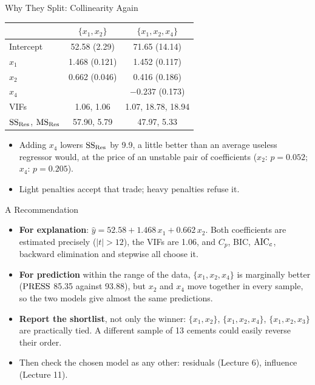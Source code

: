 \begin{frame}{Why They Split: Collinearity Again}
    \begin{center}
        \small
        \begin{tabular}{lcc}
            \toprule
            & $\{x_1,x_2\}$ & $\{x_1,x_2,x_4\}$ \\
            \midrule
            Intercept & 52.58 (2.29) & 71.65 (14.14) \\
            $x_1$ & 1.468 (0.121) & 1.452 (0.117) \\
            $x_2$ & 0.662 (0.046) & 0.416 (0.186) \\
            $x_4$ & & $-0.237$ (0.173) \\
            \midrule
            VIFs & 1.06, 1.06 & 1.07, 18.78, 18.94 \\
            $\mathrm{SS}_{\mathrm{Res}}$, $\mathrm{MS}_{\mathrm{Res}}$ & 57.90, 5.79 & 47.97, 5.33 \\
            \bottomrule
        \end{tabular}
    \end{center}
    \begin{itemize}
        \item Adding $x_4$ lowers $\mathrm{SS}_{\mathrm{Res}}$ by 9.9, a little better than an average useless regressor would, at the price of an unstable pair of coefficients ($x_2$: $p=0.052$; $x_4$: $p=0.205$).
        \item Light penalties accept that trade; heavy penalties refuse it.
    \end{itemize}
\end{frame}


\begin{frame}{A Recommendation}
    \begin{itemize}
        \item \textbf{For explanation}: $\hat y=52.58+1.468\,x_1+0.662\,x_2$. Both coefficients are estimated precisely ($|t|>12$), the VIFs are 1.06, and $C_p$, BIC, $\mathrm{AIC}_{c}$, backward elimination and stepwise all choose it.
        \item \textbf{For prediction} within the range of the data, $\{x_1,x_2,x_4\}$ is marginally better ($\mathrm{PRESS}$ 85.35 against 93.88), but $x_2$ and $x_4$ move together in every sample, so the two models give almost the same predictions.
        \item \textbf{Report the shortlist}, not only the winner: $\{x_1,x_2\}$, $\{x_1,x_2,x_4\}$, $\{x_1,x_2,x_3\}$ are practically tied. A different sample of 13 cements could easily reverse their order.
        \item Then check the chosen model as any other: residuals (Lecture 6), influence (Lecture 11).
    \end{itemize}
\end{frame}


